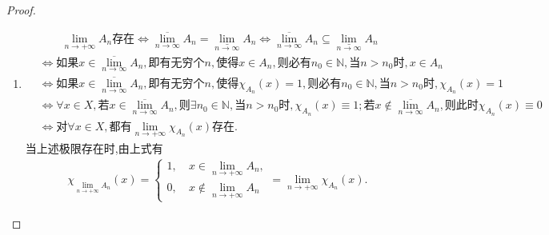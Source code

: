 \documentclass[../../main.tex]{subfiles}%
\begin{document}
\begin{proof}
\begin{enumerate}[(1)]
\item 
\begin{align*}
&\quad \quad \lim_{n\rightarrow +\infty} A_n\text{存在}\Longleftrightarrow \underset{n\rightarrow \infty}{\overline{\lim }}A_n=\underset{n\rightarrow \infty}{\underline{\lim }}A_n\Longleftrightarrow \underset{n\rightarrow \infty}{\overline{\lim }}A_n\subseteq \underset{n\rightarrow \infty}{\underline{\lim }}A_n\\
&\Longleftrightarrow \text{如果}x\in \underset{n\rightarrow \infty}{\overline{\lim }}A_n,\text{即有无穷个}n,\text{使得}x\in A_n,\text{则必有}n_0\in \mathbb{N} ,\text{当}n>n_0\text{时},x\in A_n\\
&\Longleftrightarrow \text{如果}x\in \underset{n\rightarrow \infty}{\overline{\lim }}A_n,\text{即有无穷个}n,\text{使得}\chi _{A_n}(x)=1,\text{则必有}n_0\in \mathbb{N} ,\text{当}n>n_0\text{时},\chi _{A_n}(x)=1\\
&\Longleftrightarrow \forall x\in X,\text{若}x\in \underset{n\rightarrow \infty}{\overline{\lim }}A_n,\text{则}\exists n_0\in \mathbb{N} ,\text{当}n>n_0\text{时},\chi _{A_n}(x)\equiv 1;\text{若}x\notin \underset{n\rightarrow \infty}{\overline{\lim }}A_n,\text{则此时}\chi _{A_n}(x)\equiv 0\\
&\Longleftrightarrow \text{对}\forall x\in X,\text{都有}\lim_{n\rightarrow +\infty} \chi _{A_n}(x)\text{存在}.
\end{align*}
当上述极限存在时,由上式有
\begin{align*}
\chi_{\lim\limits_{n\to+\infty}A_n}(x)=\begin{cases}1,\ &x\in\lim\limits_{n\to+\infty}A_n,\\0,\ &x\notin\lim\limits_{n\to+\infty}A_n\end{cases}=\lim\limits_{n\to+\infty}\chi_{A_n}(x).
\end{align*}
\end{enumerate}
\end{proof}
\end{document}
